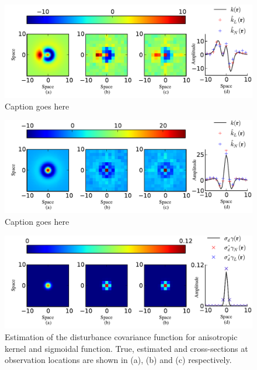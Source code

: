 \documentclass[10pt,twocolumn,twoside]{IEEEtran}
\begin{document}
\begin{figure}[ht]
	\centering
		\includegraphics[scale=1]{./Graph/AnisoKernelIEEE1.pdf}
	\caption{Caption goes here}
	\label{fig:label1}
\end{figure}

\begin{figure}[ht]
	\centering
		\includegraphics[scale=1]{./Graph/IsoKernelIEEE.pdf}
	\caption{Caption goes here}
	\label{fig:label2}
\end{figure}  

\begin{figure}[ht]
	\centering
		\includegraphics[scale=1]{./Graph/DisturbanceWidthEstimation.pdf}
	\caption{Estimation of the disturbance covariance function for anisotropic kernel and sigmoidal function. True, estimated and cross-sections at observation locations are shown in (a), (b) and (c) respectively.}
	\label{fig:label3}
\end{figure}
\end{document}
